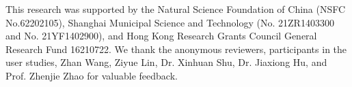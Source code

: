 
\begin{acks}
This research was supported by the Natural Science Foundation of China (NSFC No.62202105), Shanghai Municipal Science and Technology (No. 21ZR1403300 and No. 21YF1402900), and Hong Kong Research Grants Council General Research Fund 16210722.
We thank the anonymous reviewers, participants in the user studies, Zhan Wang, Ziyue Lin, Dr. Xinhuan Shu, Dr. Jiaxiong Hu, and Prof. Zhenjie Zhao for valuable feedback.
\end{acks}